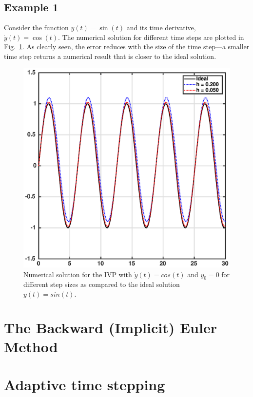 \subsection{Example 1}

Consider the function $y(t) = \sin (t)$ and its time derivative, $\dot{y}(t) = \cos (t)$. The numerical solution for different time steps are plotted in Fig.~\ref{fig:IVP1}. As clearly seen, the error reduces with the size of the time step---a smaller time step returns a numerical result that is closer to the ideal solution.
\begin{figure}[!b]
\centering
\includegraphics[scale=1.0]{figs/eulerTest}
\caption{Numerical solution for the IVP with $\dot{y}(t)=cos(t)$ and $y_{0}=0$ for different step sizes as compared to the ideal solution $y(t)=sin(t)$.}
\label{fig:IVP1}
\end{figure}

\section{The Backward (Implicit) Euler Method}

\section{Adaptive time stepping}
